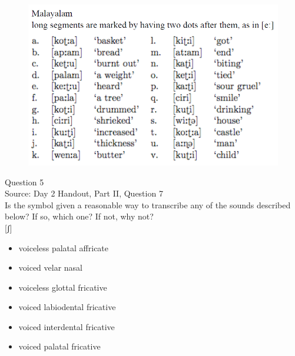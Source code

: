 \documentclass[12pt]{article}
\begin{document}
\begin{figure}[H]
\includegraphics{../images/malayalam.png}
\end{figure}

\newpage

{\large Question 5}\\

Source: Day 2 Handout, Part II, Question 7\\

Is the symbol given a reasonable way to transcribe any of the sounds described below? If so, which one? If not, why not?\\

{[ʃ]}

\begin{itemize} \item voiceless palatal affricate \item voiced velar nasal \item voiceless glottal fricative \item voiced labiodental fricative \item voiced interdental fricative \item voiced palatal fricative \end{itemize}


\newpage

\begin{center}
\textbf{{\color{red}{\HUGE END OF EXAM}}}\\

\end{center}
\newpage

\begin{center}
\textbf{{\color{blue}{\HUGE START OF EXAM\\}}}

\textbf{{\color{blue}{\HUGE Student ID: 6948\\}}}

\textbf{{\color{blue}{\HUGE 4:45 - 5:00 PM\\}}}

\end{center}
\newpage
\end{document}
